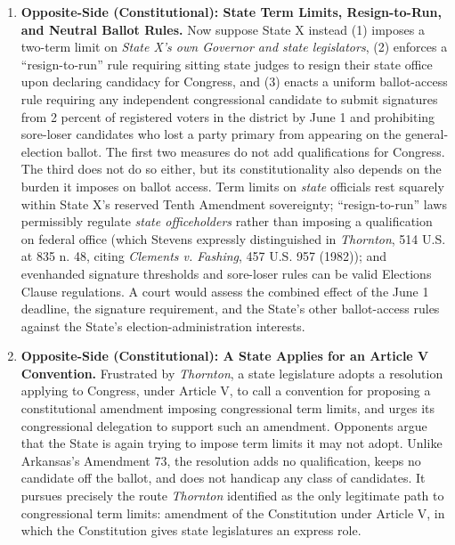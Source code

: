 \documentclass[12pt]{article}
\begin{document}
\begin{enumerate}
\item \textbf{Opposite-Side (Constitutional): State Term Limits, Resign-to-Run, and Neutral Ballot Rules.} Now suppose State X instead (1) imposes a two-term limit on \textit{State X's own Governor and state legislators}, (2) enforces a ``resign-to-run'' rule requiring sitting state judges to resign their state office upon declaring candidacy for Congress, and (3) enacts a uniform ballot-access rule requiring any independent congressional candidate to submit signatures from 2 percent of registered voters in the district by June 1 and prohibiting sore-loser candidates who lost a party primary from appearing on the general-election ballot. The first two measures do not add qualifications for Congress. The third does not do so either, but its constitutionality also depends on the burden it imposes on ballot access. Term limits on \textit{state} officials rest squarely within State X's reserved Tenth Amendment sovereignty; ``resign-to-run'' laws permissibly regulate \textit{state officeholders} rather than imposing a qualification on federal office (which Stevens expressly distinguished in \textit{Thornton}, 514 U.S. at 835 n. 48, citing \textit{Clements v. Fashing}, 457 U.S. 957 (1982)); and evenhanded signature thresholds and sore-loser rules can be valid Elections Clause regulations. A court would assess the combined effect of the June 1 deadline, the signature requirement, and the State's other ballot-access rules against the State's election-administration interests.

\item \textbf{Opposite-Side (Constitutional): A State Applies for an Article V Convention.} Frustrated by \textit{Thornton}, a state legislature adopts a resolution applying to Congress, under Article V, to call a convention for proposing a constitutional amendment imposing congressional term limits, and urges its congressional delegation to support such an amendment. Opponents argue that the State is again trying to impose term limits it may not adopt. Unlike Arkansas's Amendment 73, the resolution adds no qualification, keeps no candidate off the ballot, and does not handicap any class of candidates. It pursues precisely the route \textit{Thornton} identified as the only legitimate path to congressional term limits: amendment of the Constitution under Article V, in which the Constitution gives state legislatures an express role.


\end{enumerate}
\end{document}
